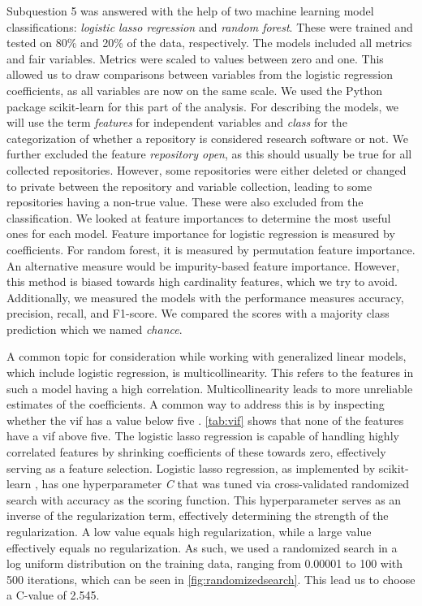 Subquestion 5 was answered with the help of two machine learning model classifications: \textit{logistic lasso regression} and \textit{random forest}. These were trained and tested on 80\% and 20\% of the data, respectively. The models included all metrics and \acrshort{fair} variables. Metrics were scaled to values between zero and one. This allowed us to draw comparisons between variables from the logistic regression coefficients, as all variables are now on the same scale. We used the Python package scikit-learn \cite{scikit-learn} for this part of the analysis.
For describing the models, we will use the term \textit{features} for independent variables and \textit{class} for the categorization of whether a repository is considered research software or not.
We further excluded the feature \textit{repository open}, as this should usually be true for all collected repositories. However, some repositories were either deleted or changed to private between the repository and variable collection, leading to some repositories having a non-true value. These were also excluded from the classification.
We looked at feature importances to determine the most useful ones for each model. Feature importance for logistic regression is measured by coefficients. For random forest, it is measured by permutation feature importance. An alternative measure would be impurity-based feature importance. However, this method is biased towards high cardinality features, which we try to avoid. Additionally, we measured the models with the performance measures accuracy, precision, recall, and F1-score. We compared the scores with a majority class prediction which we named \textit{chance}.


A common topic for consideration while working with generalized linear models, which include logistic regression, is multicollinearity. This refers to the features in such a model having a high correlation. Multicollinearity leads to more unreliable estimates of the coefficients. A common way to address this is by inspecting whether the \acrfull{vif} has a value below five \cite{akinwande_variance_2015}. \autoref{tab:vif} shows that none of the features have a \acrshort{vif} above five.
%
The logistic lasso regression is capable of handling highly correlated features by shrinking coefficients of these towards zero, effectively serving as a feature selection. Logistic lasso regression, as implemented by scikit-learn \cite{scikit-learn}, has one hyperparameter \textit{C} that was tuned via cross-validated randomized search with accuracy as the scoring function. This hyperparameter serves as an inverse of the regularization term, effectively determining the strength of the regularization. A low value equals high regularization, while a large value effectively equals no regularization. As such, we used a randomized search in a log uniform distribution on the training data, ranging from 0.00001 to 100 with 500 iterations, which can be seen in \autoref{fig:randomizedsearch}. This lead us to choose a C-value of 2.545. 


